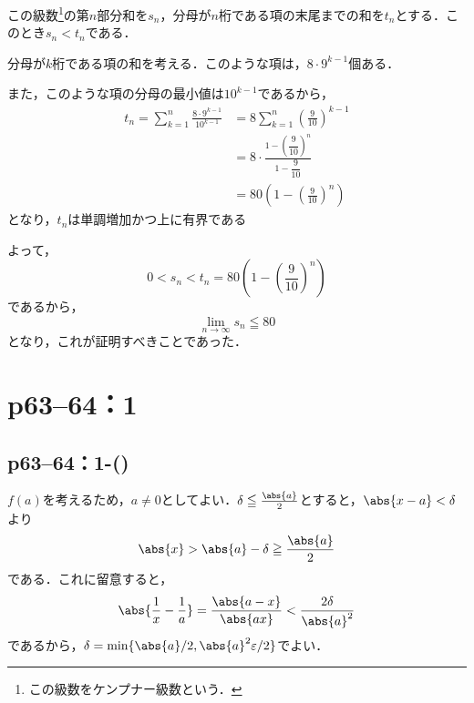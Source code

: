 \begin{tproof}
    この級数\footnote{この級数をケンプナー級数という．}の第$n$部分和を$s_n$，分母が$n$桁である項の末尾までの和を$t_n$とする．このとき$s_n < t_n$である．

    分母が$k$桁である項の和を考える．このような項は，$8 \cdot 9^{k-1}$個ある．

    また，このような項の分母の最小値は$10^{k-1}$であるから，
    \begin{align*}
        t_n = \sum_{k=1}^{n} \frac{8 \cdot 9^{k-1}}{10^{k-1}} & = 8 \sum_{k=1}^{n} \left(\frac{9}{10}\right)^{k-1}               \\
                                                              & = 8 \cdot \frac{1-\left(\dfrac{9}{10}\right)^n}{1-\dfrac{9}{10}} \\
                                                              & = 80 \left(1-\left(\frac{9}{10}\right)^n\right)
    \end{align*}
    となり，$t_n$は単調増加かつ上に有界である

    よって，
    \[
        0 < s_n < t_n = 80 \left(1-\left(\frac{9}{10}\right)^n\right)
    \]
    であるから，
    \[
        \lim_{n \to \infty} s_n \leqq 80
    \]
    となり，これが証明すべきことであった．
\end{tproof}


\newpage


\section*{p63--64：1}

\subsection*{p63--64：1-()}

\begin{tanswer}
    $f(a)$を考えるため，$a \ne 0$としてよい．$\delta \le \frac{\abs{a}}{2}$とすると，$\abs{x-a}<\delta$より
    \[
        \abs{x} > \abs{a}-\delta \ge \frac{\abs{a}}{2}
    \]
    である．これに留意すると，
    \[
        \abs{\frac{1}{x}-\frac{1}{a}}=\frac{\abs{a-x}}{\abs{ax}} <\frac{2 \delta}{\abs{a}^2}
    \]
    であるから，$\delta = \min \{ \abs{a}/2,\abs{a}^2\varepsilon/2 \}$でよい．
\end{tanswer}



